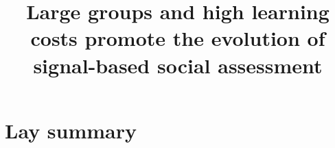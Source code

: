 




\noindent
\title{Large groups and high learning costs promote the evolution of signal-based social assessment} 
\author{}
\date{} 
\maketitle


\linenumbers

\section*{Lay summary}



